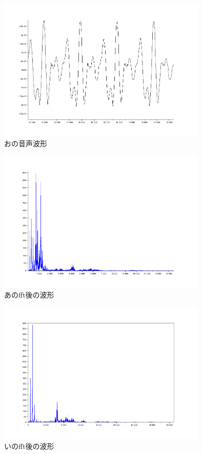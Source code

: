 \documentclass[12pt,oneside]{sotsuken_paper}
\begin{document}
\begin{figure}[htbp]
\begin{center}
\includegraphics[width=100mm]{img/o.png}
\caption{おの音声波形}
\label{fig:voice-o}
\end{center}
\end{figure}


\begin{figure}[htbp]
\begin{center}
\includegraphics[width=100mm]{img/a_fft.png}
\caption{あのfft後の波形}
\label{fig:a_fft}
\end{center}
\end{figure}


\begin{figure}[htbp]
\begin{center}
\includegraphics[width=100mm]{img/i_fft.png}
\caption{いのfft後の波形}
\label{fig:i_fft}
\end{center}
\end{figure}
\end{document}
